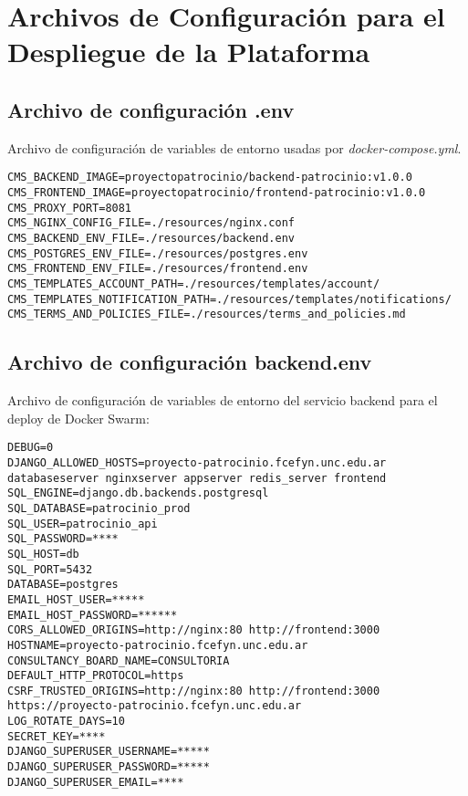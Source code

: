 \chapter{Archivos de Configuración para el Despliegue de la Plataforma}\label{cap:apendix-configfile-deloy}

\section{Archivo de configuración \textbf{.env}}\label{sec:anexo:configfile-env}
Archivo de configuración de variables de entorno usadas por \textit{docker-compose.yml}.
\begin{lstlisting}[caption={Archivo de configuración .env}, label={cod:.env}, captionpos=b]
CMS_BACKEND_IMAGE=proyectopatrocinio/backend-patrocinio:v1.0.0
CMS_FRONTEND_IMAGE=proyectopatrocinio/frontend-patrocinio:v1.0.0
CMS_PROXY_PORT=8081
CMS_NGINX_CONFIG_FILE=./resources/nginx.conf
CMS_BACKEND_ENV_FILE=./resources/backend.env
CMS_POSTGRES_ENV_FILE=./resources/postgres.env
CMS_FRONTEND_ENV_FILE=./resources/frontend.env
CMS_TEMPLATES_ACCOUNT_PATH=./resources/templates/account/
CMS_TEMPLATES_NOTIFICATION_PATH=./resources/templates/notifications/
CMS_TERMS_AND_POLICIES_FILE=./resources/terms_and_policies.md
\end{lstlisting}



\section{Archivo de configuración \textbf{backend.env}}\label{sec:anexo:configfile-backend-env}
Archivo de configuración de variables de entorno del servicio backend para el deploy de Docker Swarm:

\begin{lstlisting}[caption={Archivo de configuración backend.env}, label={cod:backend.env}, captionpos=b]
DEBUG=0
DJANGO_ALLOWED_HOSTS=proyecto-patrocinio.fcefyn.unc.edu.ar databaseserver nginxserver appserver redis_server frontend
SQL_ENGINE=django.db.backends.postgresql
SQL_DATABASE=patrocinio_prod
SQL_USER=patrocinio_api
SQL_PASSWORD=****
SQL_HOST=db
SQL_PORT=5432
DATABASE=postgres
EMAIL_HOST_USER=*****
EMAIL_HOST_PASSWORD=******
CORS_ALLOWED_ORIGINS=http://nginx:80 http://frontend:3000
HOSTNAME=proyecto-patrocinio.fcefyn.unc.edu.ar
CONSULTANCY_BOARD_NAME=CONSULTORIA
DEFAULT_HTTP_PROTOCOL=https
CSRF_TRUSTED_ORIGINS=http://nginx:80 http://frontend:3000 https://proyecto-patrocinio.fcefyn.unc.edu.ar
LOG_ROTATE_DAYS=10
SECRET_KEY=****
DJANGO_SUPERUSER_USERNAME=*****
DJANGO_SUPERUSER_PASSWORD=*****
DJANGO_SUPERUSER_EMAIL=****
\end{lstlisting}


